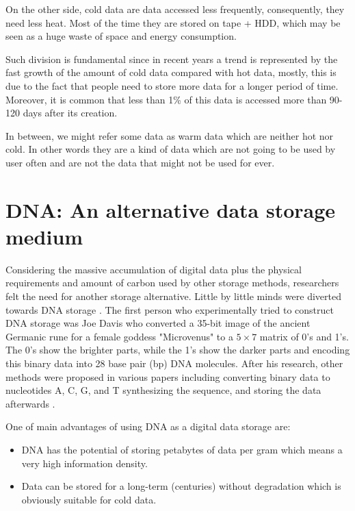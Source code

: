 \documentclass[10pt,twocolumn,twoside]{gsajnl}
\theoremstyle{definition}
\begin{document}
On the other side, cold data are data accessed less frequently, consequently, they need less heat. Most of the time they are stored on tape + HDD, which may be seen as a huge waste of space and energy consumption.

Such division is fundamental since in recent years a trend is represented by the fast growth of the amount of cold data compared with hot data, mostly, this is due to the fact that people need to store more data for a longer period of time. Moreover, it is common that less than 1\% of this data is accessed more than 90-120 days after its creation\cite{alliance2021preserving}. 

In between, we might refer some data as warm data which are neither hot nor cold. In other words they are a kind of data which are not going to be used by user often and are not the data that might not be used for ever.

\section{DNA: An alternative data storage medium}
\label{sec:DNA: An alternative data storage medium}
Considering the massive accumulation of digital data plus the physical requirements and amount of carbon used by other storage methods, researchers felt the need for another storage alternative. Little by little minds were diverted towards DNA storage \cite{choi2019high}. The first person who experimentally tried to construct DNA storage was Joe Davis who converted a 35-bit image of the ancient Germanic rune for a female goddess "Microvenus" to a $5\times7$ matrix of 0's and 1's. The 0's show the brighter parts, while the 1's show the darker parts and encoding this binary data into 28 base pair (bp) DNA molecules. After his research, other methods were proposed in various papers including converting binary data to nucleotides A, C, G, and T synthesizing the sequence, and storing the data afterwards \cite{dong2020dna}.

One of main advantages of using DNA as a digital data storage are:
\begin{itemize}
    \item DNA has the potential of storing petabytes of data per gram which means a very high information density.
    \item Data can be stored for a long-term (centuries) without degradation which is obviously suitable for cold data.  
\end{itemize}
\end{document}

